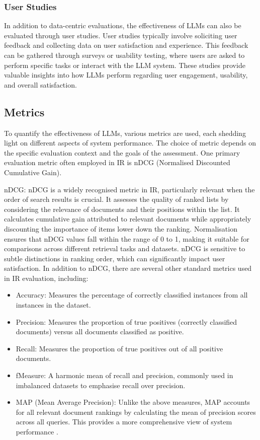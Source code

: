 \subsubsection{User Studies}
In addition to data-centric evaluations, the effectiveness of LLMs can also be evaluated through user studies. User studies typically involve soliciting user feedback and collecting data on user satisfaction and experience. This feedback can be gathered through surveys or usability testing, where users are asked to perform specific tasks or interact with the LLM system. These studies provide valuable insights into how LLMs perform regarding user engagement, usability, and overall satisfaction.

\subsection{Metrics}
To quantify the effectiveness of LLMs, various metrics are used, each shedding light on different aspects of system performance. The choice of metric depends on the specific evaluation context and the goals of the assessment. One primary evaluation metric often employed in IR is nDCG (Normalised Discounted Cumulative Gain).

nDCG: nDCG is a widely recognised metric in IR, particularly relevant when the order of search results is crucial. It assesses the quality of ranked lists by considering the relevance of documents and their positions within the list. It calculates cumulative gain attributed to relevant documents while appropriately discounting the importance of items lower down the ranking. Normalisation ensures that nDCG values fall within the range of 0 to 1, making it suitable for comparisons across different retrieval tasks and datasets. nDCG is sensitive to subtle distinctions in ranking order, which can significantly impact user satisfaction.
In addition to nDCG, there are several other standard metrics used in IR evaluation, including:

\begin{itemize}
    \item Accuracy: Measures the percentage of correctly classified instances from all instances in the dataset.
    \item Precision: Measures the proportion of true positives (correctly classified documents) versus all documents classified as positive.
    \item Recall: Measures the proportion of true positives out of all positive documents.
    \item fMeasure: A harmonic mean of recall and precision, commonly used in imbalanced datasets to emphasise recall over precision.
    \item MAP (Mean Average Precision): Unlike the above measures, MAP accounts for all relevant document rankings by calculating the mean of precision scores across all queries. This provides a more comprehensive view of system performance \cite{sokolova}.
\end{itemize}


